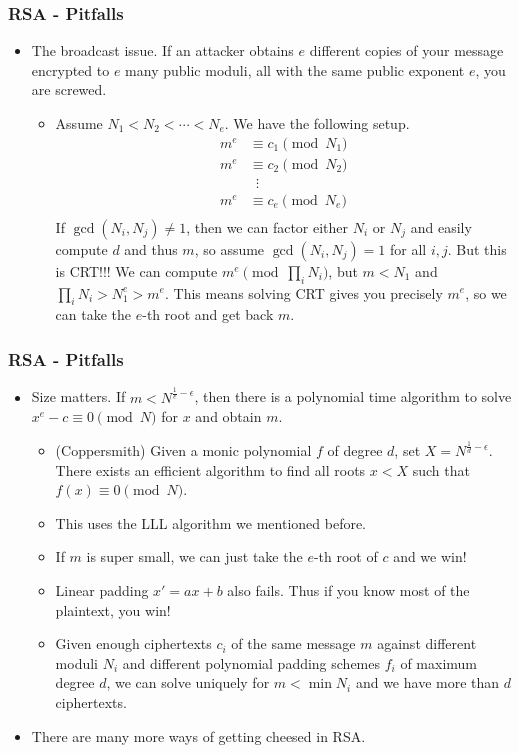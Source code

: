 \documentclass[aspectratio=169,t]{beamer}
\begin{document}
\begin{frame}
\frametitle{RSA - Pitfalls}
\begin{itemize}
\item
The broadcast issue. If an attacker obtains $e$ different copies of your message
encrypted to $e$ many public moduli, all with the same public exponent $e$, you
are screwed. \pause
\begin{itemize}
\item
Assume $N_1 < N_2 < \cdots < N_e$. We have the following setup.
\[ \begin{aligned}
m^e &\equiv c_1 \pmod{N_1} \\
m^e &\equiv c_2 \pmod{N_2} \\
&\,\,\,\vdots \\
m^e &\equiv c_e \pmod{N_e} \\
\end{aligned} \] \pause
If $\gcd(N_i, N_j) \neq 1$, then we can factor either $N_i$ or $N_j$ and easily
compute $d$ and thus $m$, so assume $\gcd(N_i, N_j) = 1$ for all $i, j$. But
this is CRT!!! We can compute $m^e \pmod{\prod_i N_i}$, but $m < N_1$ and
$\prod_i N_i > N_1^e > m^e$. This means solving CRT gives you precisely $m^e$,
so we can take the $e$-th root and get back $m$.
\end{itemize}
\end{itemize}
\end{frame}

\begin{frame}
\frametitle{RSA - Pitfalls}
\begin{itemize}
\item
Size matters. If $m < N^{\frac{1}{e} - \epsilon}$, then there is a polynomial
time algorithm to solve $x^e - c \equiv 0 \pmod{N}$ for $x$ and obtain $m$.
\pause
\begin{itemize}
\item
(Coppersmith) Given a monic polynomial $f$ of degree $d$, set $X =
N^{\frac{1}{d} - \epsilon}$. There exists an efficient algorithm to find all
roots $x < X$ such that $f(x) \equiv 0 \pmod{N}$.
\item
This uses the LLL algorithm we mentioned before. \pause
\item
If $m$ is super small, we can just take the $e$-th root of $c$ and we win!
\pause
\item
Linear padding $x' = ax + b$ also fails. Thus if you know most of the plaintext,
you win! \pause
\item
Given enough ciphertexts $c_i$ of the same message $m$ against different moduli
$N_i$ and different polynomial padding schemes $f_i$ of maximum degree $d$, we
can solve uniquely for $m < \min N_i$ and we have more than $d$ ciphertexts.
\end{itemize}
\pause
\item
There are many more ways of getting cheesed in RSA.
\end{itemize}
\end{frame}
\end{document}
